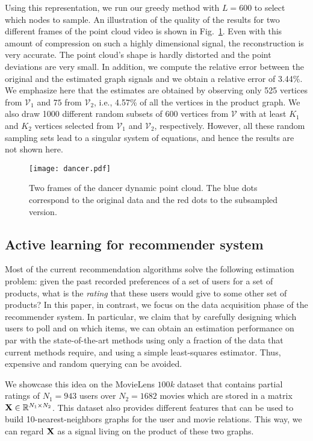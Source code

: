 \documentclass{article}
\begin{document}
Using this representation, we run our greedy method with $L=600$ to select which nodes to sample. An illustration of the quality of the results for two different frames of the point cloud video is shown in Fig.~\ref{fig:dancer}. Even with this amount of compression on such a highly dimensional signal, the reconstruction is very accurate. The point cloud's shape is hardly distorted and the point deviations are very small. In addition, we compute the relative error between the original and the estimated graph signals and we obtain a relative error of 3.44\%. We emphasize here that the estimates are obtained by observing only 525 vertices from $\mathcal{V}_1$ and $75$ from $\mathcal{V}_2$, i.e., 4.57\% of all the vertices in the product graph. We also draw 1000 different random subsets of 600 vertices from $\mathcal{V}$ with at least $K_1$ and $K_2$ vertices selected from $\mathcal{V}_1$ and $\mathcal{V}_2$, respectively. However, all these random sampling sets lead to a singular system of equations, and hence the results are not shown here.

\begin{figure}
	\centering
	\texttt{[image: dancer.pdf]}
	\caption{Two frames of the dancer dynamic point cloud. The blue dots correspond to the original data and the red dots to the subsampled version.}
	\label{fig:dancer}
\end{figure}


\subsection{Active learning for recommender system}

Most of the current recommendation algorithms solve the following estimation problem: given the past recorded preferences of a set of users for a set of products, what is the \emph{rating} that these users would give to some other set of products? In this paper, in contrast, we focus on the data acquisition phase of the recommender system. In particular, we claim that by carefully designing which users to poll and on which items, we can obtain an estimation performance on par with the state-of-the-art methods using only a fraction of the data that current methods require, and using a simple least-squares estimator. Thus, expensive and random querying can be avoided.

We showcase this idea on the MovieLens $100k$ dataset \cite{movielens} that contains partial ratings of $N_1=943$ users over $N_2=1682$ movies which are stored in a matrix $\boldsymbol{\mathrm{X}}\in\mathbb{R}^{N_1\times N_2}$. This dataset also provides different features that can be used to build 10-nearest-neighbors graphs for the user and movie relations. This way, we can regard $\boldsymbol{\mathrm{X}}$ as a signal living on the product of these two graphs.
\end{document}
